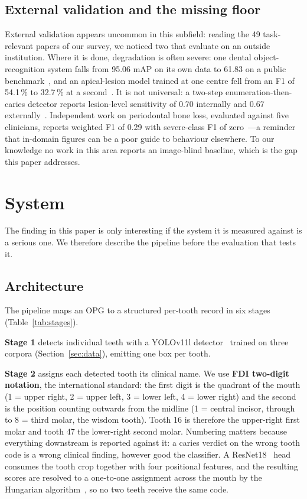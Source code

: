 \documentclass[conference]{IEEEtran}
\begin{document}
\subsection{External validation and the missing floor}
External validation appears uncommon in this subfield: reading the 49
task-relevant papers of our survey, we noticed two that evaluate on an outside
institution. Where it is done,
degradation is often severe: one dental object-recognition system falls from
95.06 mAP on its own data to 61.83 on a public
benchmark~\cite{cao2024dpml}, and an apical-lesion model trained at one centre fell
from an F1 of 54.1\,\% to 32.7\,\% at a second~\cite{krois2021generalizability}.
It is not universal: a two-step enumeration-then-caries detector reports lesion-level
sensitivity of 0.70 internally and 0.67 externally~\cite{bizjak2024advancing}.
Independent work on periodontal bone loss,
evaluated against five clinicians, reports weighted F1 of 0.29 with severe-class
F1 of zero~\cite{cerda2024determining}---a reminder that in-domain figures can be
a poor guide to behaviour elsewhere. To our knowledge no work in this area
reports an image-blind baseline, which is the gap this paper addresses.

\section{System}

The finding in this paper is only interesting if the system it is measured
against is a serious one. We therefore describe the pipeline before the
evaluation that tests it.

\subsection{Architecture}
The pipeline maps an OPG to a structured per-tooth record in six stages
(Table~\ref{tab:stages}).

\textbf{Stage 1} detects individual teeth with a YOLOv11l
detector~\cite{jocher2024yolo11} trained on three corpora
(Section~\ref{sec:data}), emitting one box per tooth.

\textbf{Stage 2} assigns each detected tooth its clinical name. We use
\textbf{FDI two-digit notation}, the international standard: the first digit is
the quadrant of the mouth (1 = upper right, 2 = upper left, 3 = lower left,
4 = lower right) and the second is the position counting outwards from the
midline (1 = central incisor, through to 8 = third molar, the wisdom tooth).
Tooth 16 is therefore the upper-right first molar and tooth 47 the lower-right
second molar. Numbering matters because everything downstream is reported
against it: a caries verdict on the wrong tooth code is a wrong clinical
finding, however good the classifier. A ResNet18~\cite{he2016resnet} head
consumes the tooth crop together with four positional features, and the
resulting scores are resolved to a one-to-one assignment across the mouth by the
Hungarian algorithm~\cite{kuhn1955hungarian}, so no two teeth receive the same
code.
\end{document}
